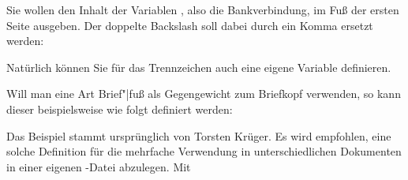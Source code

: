 %
\begin{Example}
  Sie wollen den Inhalt der Variablen ,
  also die Bankverbindung, im Fuß der ersten Seite ausgeben. Der doppelte
  Backslash soll dabei durch ein Komma ersetzt werden:
\begin{lstcode}
\end{lstcode}
  Natürlich können Sie für das Trennzeichen auch eine eigene Variable
  definieren.%
  %

  Will man eine Art Brief"|fuß als Gegengewicht zum Briefkopf verwenden, so
  kann dieser beispielsweise wie folgt definiert werden:
\begin{lstcode}
\end{lstcode}
  Das Beispiel stammt ursprünglich von Torsten Krüger. Es wird empfohlen, eine
  solche Definition für die mehrfache Verwendung in unterschiedlichen
  Dokumenten in einer eigenen
  -Datei abzulegen. Mit
\begin{lstcode}
\end{lstcode}
\end{Example}
